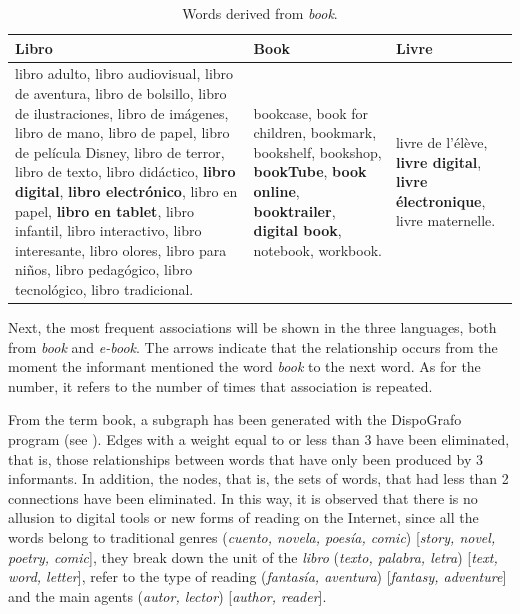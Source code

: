 \documentclass[english]{textolivre}
\begin{document}
\begin{table}[h!]
\centering
\begin{threeparttable}
\caption{Words derived from \textit{book}.}
\label{tab04}
\small
\begin{tabular}{p{6cm} p{3cm} p{3cm}}
\toprule
\textbf{Libro} & \textbf{Book} & \textbf{Livre} \\
\midrule
libro adulto, libro audiovisual, libro de aventura, libro de bolsillo, libro de ilustraciones, libro de imágenes, libro de mano, libro de papel, libro de película Disney, libro de terror, libro de texto, libro didáctico, \textbf{libro digital}, \textbf{libro electrónico}, libro en papel, \textbf{libro en tablet}, libro infantil, libro interactivo, libro interesante, libro olores, libro para niños, libro pedagógico, libro tecnológico, libro tradicional. & bookcase, book for children, bookmark, bookshelf, bookshop, \textbf{bookTube}, \textbf{book online}, \textbf{booktrailer}, \textbf{digital book}, notebook, workbook. & livre de l'élève, \textbf{livre digital}, \textbf{livre électronique}, livre maternelle.   \\
\bottomrule
\end{tabular}
\end{threeparttable}
\end{table}

Next, the most frequent associations will be shown in the three languages, both from \textit{book} and \textit{e-book}. The arrows indicate that the relationship occurs from the moment the informant mentioned the word \textit{book} to the next word. As for the number, it refers to the number of times that association is repeated.

From the term book, a subgraph has been generated with the DispoGrafo program (see ). Edges with a weight equal to or less than 3 have been eliminated, that is, those relationships between words that have only been produced by 3 informants. In addition, the nodes, that is, the sets of words, that had less than 2 connections have been eliminated. In this way, it is observed that there is no allusion to digital tools or new forms of reading on the Internet, since all the words belong to traditional genres (\textit{cuento, novela, poesía, comic}) [\textit{story, novel, poetry, comic}], they break down the unit of the \textit{libro} (\textit{texto, palabra, letra}) [\textit{text, word, letter}], refer to the type of reading (\textit{fantasía, aventura}) [\textit{fantasy, adventure}] and the main agents (\textit{autor, lector}) [\textit{author, reader}].
\end{document}
